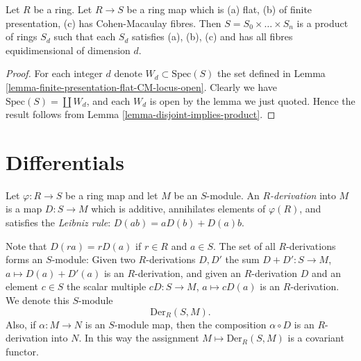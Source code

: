 \begin{lemma}
\label{lemma-relative-dimension-CM}
Let $R$ be a ring. Let $R \to S$ be a ring map
which is (a) flat, (b) of finite presentation, (c) has
Cohen-Macaulay fibres. Then $S = S_0 \times \ldots \times S_n$
is a product of rings $S_d$ such that each $S_d$ satisfies
(a), (b), (c) and has all fibres equidimensional of dimension $d$.
\end{lemma}

\begin{proof}
For each integer $d$ denote $W_d \subset \text{Spec}(S)$ the set
defined in Lemma \ref{lemma-finite-presentation-flat-CM-locus-open}.
Clearly we have $\text{Spec}(S) = \coprod W_d$, and each $W_d$
is open by the lemma we just quoted. Hence the result follows
from Lemma \ref{lemma-disjoint-implies-product}.
\end{proof}
















\section{Differentials}
\label{section-differentials}

\begin{definition}
\label{definition-derivation}
Let $\varphi : R \to S$ be a ring map and let $M$ be an $S$-module.
An {\it $R$-derivation} into $M$ is a map $D : S \to M$
which is additive, annihilates elements of $\varphi(R)$,
and satisfies the {\it Leibniz rule}: 
$D(ab) = aD(b) + D(a)b$.
\end{definition}

\noindent
Note that $D(ra) = rD(a)$ if $r\in R$ and $a\in S$.
The set of all $R$-derivations forms an
$S$-module: Given two $R$-derivations $D, D'$
the sum $D+D' : S \to M$, $a \mapsto D(a)+D'(a)$
is an $R$-derivation, and given an $R$-derivation $D$
and an element $c\in S$ the scalar multiple $cD : S \to M$,
$a \mapsto cD(a)$ is an $R$-derivation. We denote this
$S$-module
$$
\text{Der}_R(S, M).
$$
Also, if $\alpha : M \to N$ is an $S$-module map, then the
composition $\alpha \circ D$ is an $R$-derivation into
$N$. In this way the assignment $M \mapsto \text{Der}_R(S, M)$
is a covariant functor.

